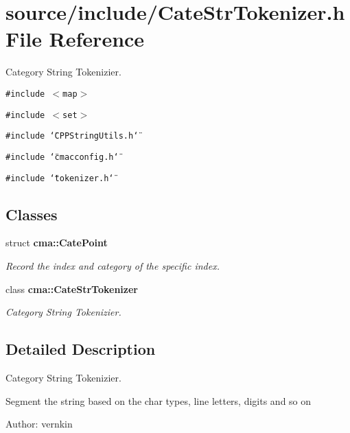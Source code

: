 \section{source/include/CateStrTokenizer.h File Reference}
\label{CateStrTokenizer_8h}
Category String Tokenizier.  


{\tt \#include $<$map$>$}\par
{\tt \#include $<$set$>$}\par
{\tt \#include \char`\"{}CPPStringUtils.h\char`\"{}}\par
{\tt \#include \char`\"{}cmacconfig.h\char`\"{}}\par
{\tt \#include \char`\"{}tokenizer.h\char`\"{}}\par
\subsection*{Classes}
\begin{CompactItemize}
\item 
struct {\bf cma::CatePoint}
\begin{CompactList}\small\item\em Record the index and category of the specific index. \item\end{CompactList}\item 
class {\bf cma::CateStrTokenizer}
\begin{CompactList}\small\item\em Category String Tokenizier. \item\end{CompactList}\end{CompactItemize}


\subsection{Detailed Description}
Category String Tokenizier. 

Segment the string based on the char types, line letters, digits and so on

\begin{Desc}
\item[Author:]vernkin \end{Desc}
